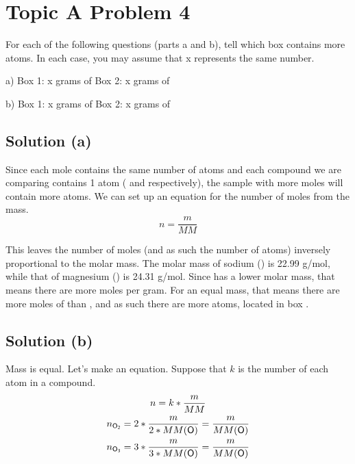 \documentclass[10pt]{article}
\begin{document}
    \pagebreak
    \section{Topic A Problem 4}
        For each of the following questions (parts a and b), tell which box contains more atoms. 
        In each case, you may assume that x represents the same number.

        a) Box 1: x grams of     Box 2: x grams of 

        b) Box 1: x grams of     Box 2: x grams of 

        \subsection{Solution (a)}
            Since each mole contains the same number of atoms and each compound we are comparing contains 1 atom ( and  respectively), the sample with more moles will contain more atoms.
            We can set up an equation for the number of moles from the mass.
            \begin{equation}
                n = \frac{m}{MM}
            \end{equation}

            This leaves the number of moles (and as such the number of atoms) inversely proportional to the molar mass. 
            The molar mass of sodium () is 22.99 \unit{\gram/\mole}, while that of magnesium () is 24.31 \unit{\gram/\mole}.
            Since  has a lower molar mass, that means there are more moles per gram.
            For an equal mass, that means there are more moles of  than , and as such there are more  atoms, located in box . 

        \subsection{Solution (b)}
            Mass is equal.
            Let's make an equation.
            Suppose that $k$ is the number of each atom in a compound.
            \begin{gather}
                n   =   k * \frac{m}{MM}\\
                n_{\ce{O2}} =   2 * \frac{m}{2 * MM(\ce{O})} = \frac{m}{MM(\ce{O})}\\
                n_{\ce{O3}} =   3 * \frac{m}{3 * MM(\ce{O})} = \frac{m}{MM(\ce{O})}
            \end{gather}
\end{document}
